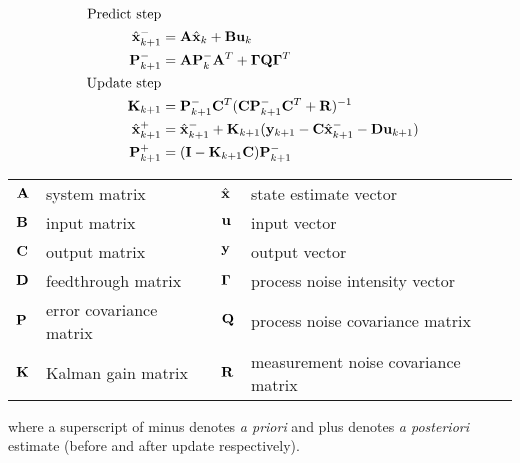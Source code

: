 \begin{theorem}
  \label{thm:kalman_filter}

  \begin{align}
    \text{Predict step} \nonumber \\
    \hat{\mathbf{x}}_{k+1}^- &= \mathbf{A}\hat{\mathbf{x}}_k + \mathbf{B} \mathbf{u}_k \\
    \mathbf{P}_{k+1}^- &= \mathbf{A} \mathbf{P}_k^- \mathbf{A}^T +
      \mathbf{\Gamma}\mathbf{Q}\mathbf{\Gamma}^T \\
    \text{Update step} \nonumber \\
    \mathbf{K}_{k+1} &=
      \mathbf{P}_{k+1}^- \mathbf{C}^T (\mathbf{C}\mathbf{P}_{k+1}^- \mathbf{C}^T +
      \mathbf{R})^{-1} \\
    \hat{\mathbf{x}}_{k+1}^+ &=
      \hat{\mathbf{x}}_{k+1}^- + \mathbf{K}_{k+1}(\mathbf{y}_{k+1} -
      \mathbf{C} \hat{\mathbf{x}}_{k+1}^- - \mathbf{D}\mathbf{u}_{k+1}) \\
    \mathbf{P}_{k+1}^+ &= (\mathbf{I} - \mathbf{K}_{k+1}\mathbf{C})\mathbf{P}_{k+1}^-
  \end{align}

  \begin{figurekey}
    \begin{tabular}{llll}
      $\mathbf{A}$ & system matrix & $\hat{\mathbf{x}}$ & state estimate vector \\
      $\mathbf{B}$ & input matrix       & $\mathbf{u}$ & input vector \\
      $\mathbf{C}$ & output matrix      & $\mathbf{y}$ & output vector \\
      $\mathbf{D}$ & feedthrough matrix & $\mathbf{\Gamma}$ & process noise intensity
        vector \\
      $\mathbf{P}$ & error covariance matrix & $\mathbf{Q}$ & process noise covariance
        matrix \\
      $\mathbf{K}$ & Kalman gain matrix & $\mathbf{R}$ & measurement noise covariance
        matrix
    \end{tabular}
  \end{figurekey}

  where a superscript of minus denotes \textit{a priori} and plus denotes
  \textit{a posteriori} estimate (before and after update respectively).
\end{theorem}

